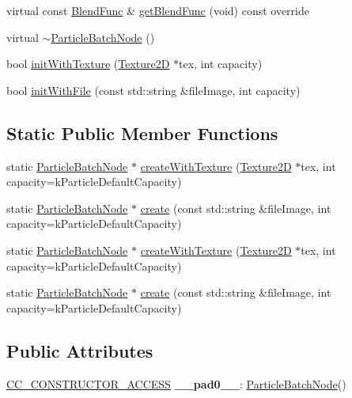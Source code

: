 \begin{DoxyCompactItemize}
\item 
virtual const \hyperlink{structBlendFunc}{Blend\+Func} \& \hyperlink{classParticleBatchNode_ab4a3ebdefd8df409c25227aad469d927}{get\+Blend\+Func} (void) const override
\item 
virtual \hyperlink{classParticleBatchNode_aeb7e2d17646bf9748cb1e274956edeb8}{$\sim$\+Particle\+Batch\+Node} ()
\item 
bool \hyperlink{classParticleBatchNode_a91c7160da6c6599fc1d150de43296cdc}{init\+With\+Texture} (\hyperlink{classTexture2D}{Texture2D} $\ast$tex, int capacity)
\item 
bool \hyperlink{classParticleBatchNode_a8d828f06462482ccfa1210502572a2c7}{init\+With\+File} (const std\+::string \&file\+Image, int capacity)
\end{DoxyCompactItemize}
\subsection*{Static Public Member Functions}
\begin{DoxyCompactItemize}
\item 
static \hyperlink{classParticleBatchNode}{Particle\+Batch\+Node} $\ast$ \hyperlink{classParticleBatchNode_a83d934d32153880237155f9f4e1789bf}{create\+With\+Texture} (\hyperlink{classTexture2D}{Texture2D} $\ast$tex, int capacity=k\+Particle\+Default\+Capacity)
\item 
static \hyperlink{classParticleBatchNode}{Particle\+Batch\+Node} $\ast$ \hyperlink{classParticleBatchNode_ade289285ac2d0d9b43b7aade5afc2868}{create} (const std\+::string \&file\+Image, int capacity=k\+Particle\+Default\+Capacity)
\item 
static \hyperlink{classParticleBatchNode}{Particle\+Batch\+Node} $\ast$ \hyperlink{classParticleBatchNode_a269188f999cb5ecad769942c547e2465}{create\+With\+Texture} (\hyperlink{classTexture2D}{Texture2D} $\ast$tex, int capacity=k\+Particle\+Default\+Capacity)
\item 
static \hyperlink{classParticleBatchNode}{Particle\+Batch\+Node} $\ast$ \hyperlink{classParticleBatchNode_aa4b9d7434e4f774c9ee1c4e2eb77043a}{create} (const std\+::string \&file\+Image, int capacity=k\+Particle\+Default\+Capacity)
\end{DoxyCompactItemize}
\subsection*{Public Attributes}
\begin{DoxyCompactItemize}
\item 
\mbox{\label{classParticleBatchNode_a57c0beefdc3cf5bd22307c08a73ff9e2}} 
\hyperlink{_2cocos2d_2cocos_2base_2ccConfig_8h_a25ef1314f97c35a2ed3d029b0ead6da0}{C\+C\+\_\+\+C\+O\+N\+S\+T\+R\+U\+C\+T\+O\+R\+\_\+\+A\+C\+C\+E\+SS} {\bfseries \+\_\+\+\_\+pad0\+\_\+\+\_\+}\+: \hyperlink{classParticleBatchNode}{Particle\+Batch\+Node}()
\end{DoxyCompactItemize}
